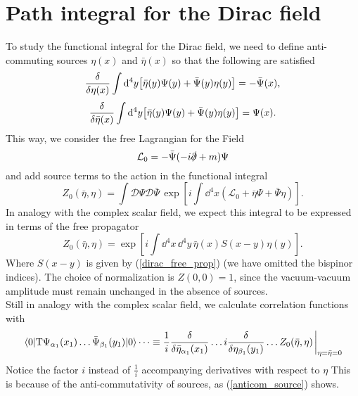 \section{Path integral for the Dirac field}
To study the functional integral for the Dirac field, we need to define anti-commuting sources $\eta(x)$ and $\bar{\eta}(x)$ so that the following are satisfied
\begin{equation}
    \fdv{\eta(x)}\int\dd^4 y \qty[\bar{\eta}(y)\Psi(y)+\bar{\Psi}(y)\eta(y)]=-\bar{\Psi}(x),
    \label{anticom_source}
\end{equation}
\begin{equation}
    \fdv{\bar{\eta}(x)}\int\dd^4 y \qty[\bar{\eta}(y)\Psi(y)+\bar{\Psi}(y)\eta(y)]={\Psi}(x).
\end{equation}
This way, we consider the free Lagrangian for the Field
\begin{equation*}
    \mathcal{L}_0=-\bar{\Psi}(-i\slashed{\partial}+m)\Psi
\end{equation*}
and add source terms to the action in the functional integral
\begin{equation}
    Z_0(\bar{\eta},\eta)=\int\mathcal{D}\Psi\mathcal{D}\bar{\Psi}\,\exp[i\int\dd^4x(\mathcal{L}_0+\bar{\eta}\Psi+\bar{\Psi}\eta)].
\end{equation}
In analogy with the complex scalar field, we expect this integral to be expressed in terms of the free propagator
\begin{equation}
    Z_0(\bar{\eta},\eta)=\exp[i\int\dd^4x\,\dd^4 y\,\bar{\eta}(x)S(x-y)\eta(y)].
    \label{Z_0_dirac}
\end{equation}
Where $S(x-y)$ is given by (\ref{dirac_free_prop}) (we have omitted the bispinor indices). The choice of normalization is $Z(0,0)=1$, since the vacuum-vacuum amplitude must remain unchanged in the absence of sources.\\

Still in analogy with the complex scalar field, we calculate correlation functions with
\begin{equation}
    \vev{\text{T}\Psi_{\alpha_1}(x_1)\dots\bar{\Psi}_{\beta_1}(y_1)}\dots\equiv\frac{1}{i}\fdv{\bar{\eta}_{\alpha_1}(x_1)}\dots i\fdv{\eta_{\beta_1}(y_1)}\dots Z_0(\bar{\eta},\eta)\eval_{\eta=\bar{\eta}=0}
\end{equation}
Notice the factor $i$ instead of $\frac{1}{i}$ accompanying derivatives with respect to $\eta$ This is because of the anti-commutativity of sources, as (\ref{anticom_source}) shows.

